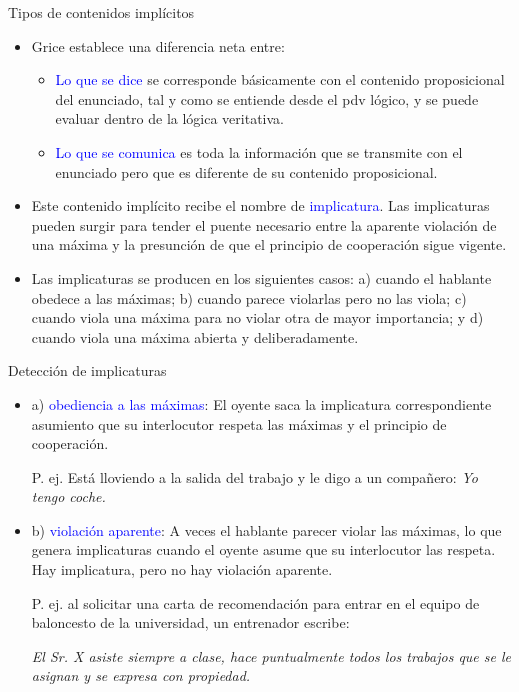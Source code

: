 \documentclass{beamer}
\begin{document}
\begin{frame}{Tipos de contenidos implícitos}

	\begin{itemize}
		\item Grice establece una diferencia neta entre: 
		\begin{itemize}
			\item \textcolor{blue}{Lo que se dice} se corresponde básicamente con el contenido proposicional del enunciado, tal y como se entiende desde el pdv lógico, y se puede evaluar dentro de la lógica veritativa.
			\item \textcolor{blue}{Lo que se comunica} es toda la información que se transmite con el enunciado pero que es diferente de su contenido proposicional. 
		\end{itemize}
		\item Este contenido implícito recibe el nombre de \textcolor{blue}{implicatura}.
Las implicaturas pueden surgir para tender el puente necesario entre la aparente violación de una máxima y la presunción de que el principio de cooperación sigue vigente.
		\item Las implicaturas se producen en los siguientes casos: a) cuando el hablante obedece a las máximas; b) cuando parece violarlas pero no las viola; c) cuando viola una máxima para no violar otra de mayor importancia; y d) cuando viola una máxima abierta y deliberadamente.
	\end{itemize}

\end{frame}

\begin{frame}{Detección de implicaturas}

	\begin{itemize}
		\item a) \textcolor{blue}{obediencia a las máximas}: El oyente saca la implicatura correspondiente asumiento que su interlocutor respeta las máximas y el principio de cooperación.
		
		P. ej. Está lloviendo a la salida del trabajo y le digo a un compañero: \it{Yo tengo coche}.
		
		\item b) \textcolor{blue}{violación aparente}: A veces el hablante parecer violar las máximas, lo que genera implicaturas cuando el oyente asume que su interlocutor las respeta. Hay implicatura, pero no hay violación aparente.

		P. ej. al solicitar una carta de recomendación para entrar en el equipo de baloncesto de la universidad, un entrenador escribe:
		
		\it{El Sr. X asiste siempre a clase, hace puntualmente todos los trabajos que se le asignan y se expresa con propiedad.}

	\end{itemize}

\end{frame}
\end{document}
